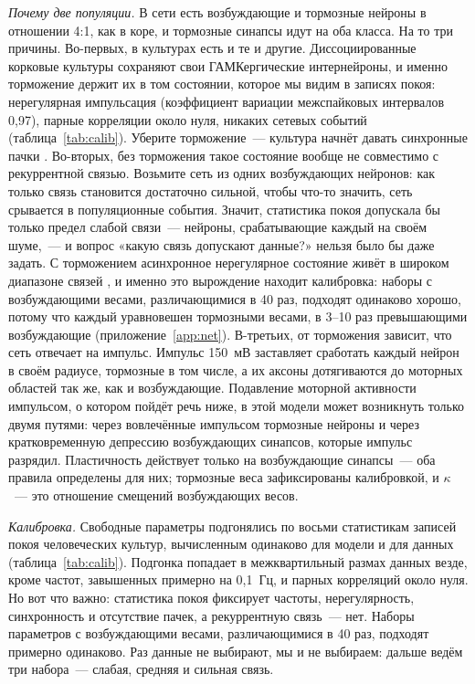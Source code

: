 \documentclass[pre,twocolumn,superscriptaddress,showpacs=false,amsmath,amssymb,nofootinbib]{revtex4-2}
\begin{document}
\emph{Почему две популяции.} В сети есть возбуждающие и тормозные нейроны в отношении 4:1, как в коре, и тормозные синапсы идут на оба класса. На то три причины. Во-первых, в культурах есть и те и другие. Диссоциированные корковые культуры сохраняют свои ГАМКергические интернейроны, и именно торможение держит их в том состоянии, которое мы видим в записях покоя: нерегулярная импульсация (коэффициент вариации межспайковых интервалов 0{,}97), парные корреляции около нуля, никаких сетевых событий (таблица~\ref{tab:calib}). Уберите торможение~--- культура начнёт давать синхронные пачки \cite{Marom2002}. Во-вторых, без торможения такое состояние вообще не совместимо с рекуррентной связью. Возьмите сеть из одних возбуждающих нейронов: как только связь становится достаточно сильной, чтобы что-то значить, сеть срывается в популяционные события. Значит, статистика покоя допускала бы только предел слабой связи~--- нейроны, срабатывающие каждый на своём шуме,~--- и вопрос «какую связь допускают данные?» нельзя было бы даже задать. С торможением асинхронное нерегулярное состояние живёт в широком диапазоне связей \cite{vanVreeswijk1996,Brunel2000}, и именно это вырождение находит калибровка: наборы с возбуждающими весами, различающимися в 40 раз, подходят одинаково хорошо, потому что каждый уравновешен тормозными весами, в 3--10 раз превышающими возбуждающие (приложение~\ref{app:net}). В-третьих, от торможения зависит, что сеть отвечает на импульс. Импульс 150~мВ заставляет сработать каждый нейрон в своём радиусе, тормозные в том числе, а их аксоны дотягиваются до моторных областей так же, как и возбуждающие. Подавление моторной активности импульсом, о котором пойдёт речь ниже, в этой модели может возникнуть только двумя путями: через вовлечённые импульсом тормозные нейроны и через кратковременную депрессию возбуждающих синапсов, которые импульс разрядил. Пластичность действует только на возбуждающие синапсы~--- оба правила определены для них; тормозные веса зафиксированы калибровкой, и $\kappa$~--- это отношение смещений возбуждающих весов.

\emph{Калибровка.} Свободные параметры подгонялись по восьми статистикам записей покоя человеческих культур, вычисленным одинаково для модели и для данных (таблица~\ref{tab:calib}). Подгонка попадает в межквартильный размах данных везде, кроме частот, завышенных примерно на 0{,}1~Гц, и парных корреляций около нуля. Но вот что важно: статистика покоя фиксирует частоты, нерегулярность, синхронность и отсутствие пачек, а рекуррентную связь~--- нет. Наборы параметров с возбуждающими весами, различающимися в 40 раз, подходят примерно одинаково. Раз данные не выбирают, мы и не выбираем: дальше ведём три набора~--- слабая, средняя и сильная связь.
\end{document}
